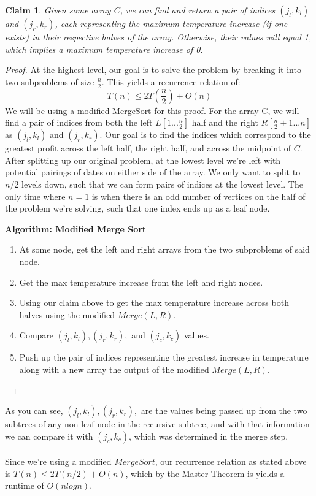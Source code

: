 \documentclass[11pt]{article}
\newtheorem{claim}[theorem]{Claim}
\begin{document}
\begin{claim} 
Given some array $C$, we can find and return a pair of indices $(j_l, k_l)$ and $(j_r, k_r)$, each representing the maximum temperature increase (if one exists) in their respective halves of the array. Otherwise, their values will equal 1, which implies a maximum temperature increase of 0.
\end{claim}
\begin{proof}
At the highest level, our goal is to solve the problem by breaking it into two subproblems of size $\frac{n}{2}$. This yields a recurrence relation of:
\begin{equation}
	T(n) \leq 2T(\frac{n}{2}) + O(n)
\end{equation}
We will be using a modified MergeSort for this proof.
For the array C, we will find a pair of indices from both the left  $L[1...\frac{n}{2}]$ half and the right $R[\frac{n}{2}+1...n]$ as $(j_l, k_l)$ and $(j_r, k_r)$.
Our goal is to find the indices which correspond to the greatest profit across the left half, the right half, and across the midpoint of $C$.\\

After splitting up our original problem, at the lowest level we're left with potential pairings of dates on either side of the array. We only want to split to $n/2$ levels down, such that we can form pairs of indices at the lowest level. The only time where $n = 1$ is when there is an odd number of vertices  on the half of the problem we're solving, such that one index ends up as a leaf node.

\textbf{Algorithm: Modified Merge Sort}
\begin{enumerate}
\item At some node, get the left and right arrays from the two subproblems of said node.
\item Get the max temperature increase from the left and right nodes.
\item Using our claim above to get the max temperature increase across both halves using the modified $Merge(L,R)$.
\item Compare $(j_l, k_l), (j_r, k_r),$ and $(j_c,  k_c)$ values.
\item Push up the pair of indices representing the greatest increase in temperature along with a new array the output of the modified $Merge(L,R)$.
\end{enumerate}
\end{proof}

As you can see, $(j_l, k_l), (j_r, k_r),$ are the values being passed up from the two subtrees of any non-leaf node in the recursive subtree, and with that information we can compare it with $(j_c,  k_c)$, which was determined in the merge step.\\
\\
Since we're using a modified $MergeSort$, our recurrence relation as stated above is $T(n) \leq 2T(n/2) + O(n)$, which by the Master Theorem is yields a runtime of $O(nlogn)$.
\end{document}
